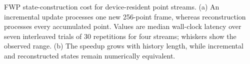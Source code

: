 \caption{FWP state-construction cost for device-resident point streams. (a) An incremental update processes one new 256-point frame, whereas reconstruction processes every accumulated point. Values are median wall-clock latency over seven interleaved trials of 30 repetitions for four streams; whiskers show the observed range. (b) The speedup grows with history length, while incremental and reconstructed states remain numerically equivalent.}
\label{fig:streaming-efficiency}
